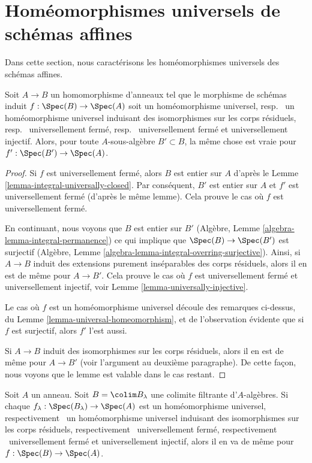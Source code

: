 \section{Homéomorphismes universels de schémas affines}
\label{section-universal-homeomorphisms-affine}

\noindent
Dans cette section, nous caractérisons les homéomorphismes universels des schémas affines.

\begin{lemma}
\label{lemma-subalgebra-inherits}
Soit $A \to B$ un homomorphisme d'anneaux tel que le morphisme de schémas
induit $f : \Spec(B) \to \Spec(A)$ soit un homéomorphisme universel, resp. \ 
un homéomorphisme universel induisant des isomorphismes sur les corps résiduels, resp.
\  universellement
fermé, resp. \  universellement fermé et universellement
injectif. Alors, pour toute $A$-sous-algèbre
$B' \subset B$, la même chose est vraie pour $f' : \Spec(B') \to \Spec(A)$.
\end{lemma}

\begin{proof}
Si $f$ est universellement fermé, alors
$B$ est entier sur $A$ d'après le Lemme \ref{lemma-integral-universally-closed}. Par conséquent, $B'$
est entier sur $A$ et $f'$
est universellement fermé (d'après le même lemme).
Cela prouve le cas où $f$ est universellement fermé.

\medskip\noindent
En continuant, nous voyons que $B$
est entier sur $B'$ (Algèbre, Lemme \ref{algebra-lemma-integral-permanence})
ce qui implique que $\Spec(B) \to \Spec(B')$ est surjectif
(Algèbre, Lemme \ref{algebra-lemma-integral-overring-surjective}). Ainsi, si $A \to B$ induit
des extensions purement inséparables des corps résiduels, alors il
en est de même pour $A \to B'$. Cela prouve le cas
où $f$ est universellement fermé et universellement
injectif, voir Lemme \ref{lemma-universally-injective}.

\medskip\noindent
Le cas où $f$ est un homéomorphisme universel découle des
remarques ci-dessus, du Lemme \ref{lemma-universal-homeomorphism}, et de l'observation
évidente que si $f$ est surjectif, alors $f'$ l'est aussi.

\medskip\noindent Si $A \to B$
induit des isomorphismes sur les corps résiduels, alors il en
est de même pour $A \to B'$ (voir l'argument au deuxième paragraphe).
De cette façon, nous voyons que le lemme est valable dans le cas restant.
\end{proof}

\begin{lemma}
\label{lemma-colimit-inherits}
Soit $A$ un anneau. Soit $B = \colim B_\lambda$ une colimite filtrante d'$A$-algèbres.
Si chaque $f_\lambda : \Spec(B_\lambda) \to \Spec(A)$ est un homéomorphisme universel, respectivement
\  un homéomorphisme
universel induisant des isomorphismes sur les corps résiduels, respectivement
\  universellement
fermé, respectivement \  universellement fermé et
universellement injectif, alors il en va de même pour $f : \Spec(B) \to \Spec(A)$.
\end{lemma}

